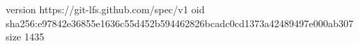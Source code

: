 version https://git-lfs.github.com/spec/v1
oid sha256:e97842e36855e1636c55d452b594462826bcadc0cd1373a42489497e000ab307
size 1435
